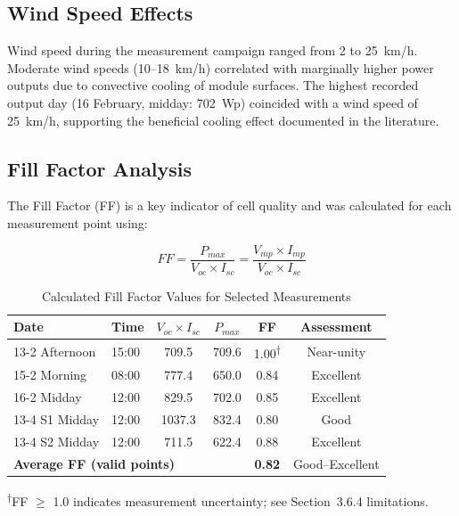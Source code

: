 \subsection{Wind Speed Effects}

Wind speed during the measurement campaign ranged from 2 to 25~km/h. Moderate wind speeds (10--18~km/h) correlated with marginally higher power outputs due to convective cooling of module surfaces. The highest recorded output day (16 February, midday: 702~Wp) coincided with a wind speed of 25~km/h, supporting the beneficial cooling effect documented in the literature.


\subsection{Fill Factor Analysis}

The Fill Factor (FF) is a key indicator of cell quality and was calculated for each measurement point using:

\begin{equation}
    FF = \frac{P_{max}}{V_{oc} \times I_{sc}} = \frac{V_{mp} \times I_{mp}}{V_{oc} \times I_{sc}}
    \label{eq:ff_calc}
\end{equation}

\begin{table}[H]
\centering
\caption{Calculated Fill Factor Values for Selected Measurements}
\label{tab:ff_values}
\small
\begin{tabular}{@{}l l c c c c@{}}
\toprule
\textbf{Date} & \textbf{Time} & \textbf{$V_{oc} \times I_{sc}$} & \textbf{$P_{max}$} & \textbf{FF} & \textbf{Assessment} \\
\midrule
13-2 Afternoon & 15:00 & 709.5 & 709.6 & 1.00\textsuperscript{$\dagger$} & Near-unity \\
15-2 Morning & 08:00 & 777.4 & 650.0 & 0.84 & Excellent \\
16-2 Midday & 12:00 & 829.5 & 702.0 & 0.85 & Excellent \\
13-4 S1 Midday & 12:00 & 1037.3 & 832.4 & 0.80 & Good \\
13-4 S2 Midday & 12:00 & 711.5 & 622.4 & 0.88 & Excellent \\
\midrule
\multicolumn{4}{l}{\textbf{Average FF (valid points)}} & \textbf{0.82} & Good--Excellent \\
\bottomrule
\end{tabular}
\begin{flushleft}
\small\textsuperscript{$\dagger$}FF $\geq$ 1.0 indicates measurement uncertainty; see Section~3.6.4 limitations.
\end{flushleft}
\end{table}

